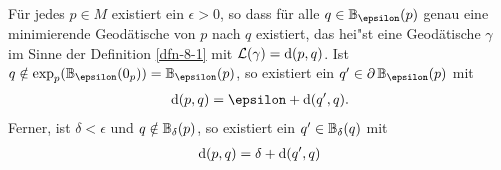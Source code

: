 \begin{Satz}\label{satz-8-7}
Für jedes $p \in M$ existiert ein $\epsilon > 0$, so dass für alle $q \in \B_{\epsilon}(p)$ genau eine minimierende Geodätische von $p$ nach $q$ existiert, das hei"st eine Geodätische $\gamma$ im Sinne der Definition \ref{dfn-8-1} mit $\mathcal L(\gamma) = \mathrm{d}(p,q)$.
Ist $q \notin \exp_p(\B_{\epsilon}(0_p)) = \B_{\epsilon}(p)$, so existiert ein $q' \in \partial \B_{\epsilon}(p)$ mit
\begin{align*}
	\dop(p,q) = \epsilon + \dop(q',q).
\end{align*}
Ferner, ist $\delta < \epsilon$ und $q \notin \operatorname{\mathbb{B}}_\delta(p)$, so existiert ein $q' \in \operatorname{\mathbb{B}}_\delta(q)$ mit
\begin{align*}
	\mathrm{d}(p,q) = \delta + \mathrm{d}(q',q)
\end{align*}
\begin{center}\end{center}
\end{Satz}

